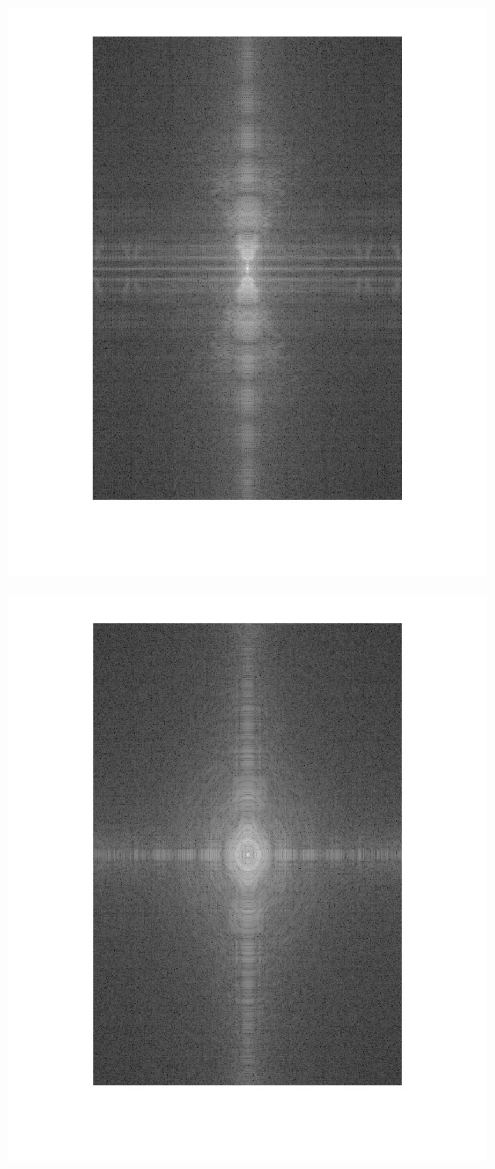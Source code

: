 \documentclass[letter]{amsart}
\begin{document}
\begin{minipage}[H]{0.33\textwidth}
    \centering
    \includegraphics[width=0.95\textwidth]{fingerprintARCH_ft.jpg}
\end{minipage}
\begin{minipage}[H]{0.33\textwidth}
    \centering
    \includegraphics[width=0.95\textwidth]{fingerprintWHORL_ft.jpg}
\end{minipage}
\end{document}
